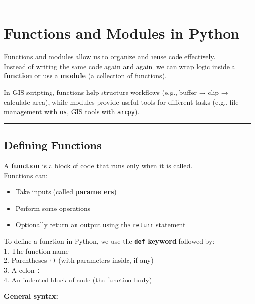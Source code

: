 \documentclass[
  11pt,
  letterpaper,
]{book}
\providecommand{\tightlist}{%
  \setlength{\itemsep}{0pt}\setlength{\parskip}{0pt}}
\begin{document}
\begin{center}\rule{0.5\linewidth}{0.5pt}\end{center}

\chapter{Functions and Modules in
Python}\label{functions-and-modules-in-python}

Functions and modules allow us to organize and reuse code effectively.\\
Instead of writing the same code again and again, we can wrap logic
inside a \textbf{function} or use a \textbf{module} (a collection of
functions).

In GIS scripting, functions help structure workflows (e.g., buffer →
clip → calculate area), while modules provide useful tools for different
tasks (e.g., file management with \texttt{os}, GIS tools with
\texttt{arcpy}).

\begin{center}\rule{0.5\linewidth}{0.5pt}\end{center}

\section{Defining Functions}\label{defining-functions}

A \textbf{function} is a block of code that runs only when it is
called.\\
Functions can:

\begin{itemize}
\tightlist
\item
  Take inputs (called \textbf{parameters})\\
\item
  Perform some operations\\
\item
  Optionally return an output using the \texttt{return} statement
\end{itemize}

To define a function in Python, we use the \textbf{\texttt{def} keyword}
followed by:\\
1. The function name\\
2. Parentheses \texttt{()} (with parameters inside, if any)\\
3. A colon \texttt{:}\\
4. An indented block of code (the function body)

\textbf{General syntax:}
\end{document}
